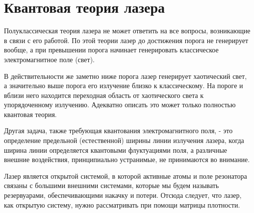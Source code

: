 \chapter{Квантовая теория лазера}
\label{chLaser}

Полуклассическая теория лазера не может ответить на все вопросы,
возникающие в связи с его работой. По этой теории лазер до достижения
порога  не генерирует вообще, а при превышении порога начинает
генерировать классическое электромагнитное поле (свет). 

В действительности же заметно ниже порога лазер генерирует хаотический
свет, а значительно выше порога его излучение близко к
классическому. На пороге и вблизи него находится переходная область от
хаотического света к упорядоченному излучению. Адекватно описать это
может только полностью квантовая теория. 

Другая задача, также требующая квантования электромагнитного поля, -
это определение предельной (естественной) ширины линии излучения
лазера, когда ширина линии определяется квантовыми флуктуациями поля,
а различные внешние воздействия, принципиально устранимые, не
принимаются во внимание. 

Лазер является открытой системой, в которой активные атомы и поле
резонатора связаны с большими внешними системами, которые мы будем
называть резервуарами, обеспечивающими накачку и потери. 
Отсюда следует, что лазер, как открытую систему, нужно рассматривать
при помощи матрицы плотности.  








